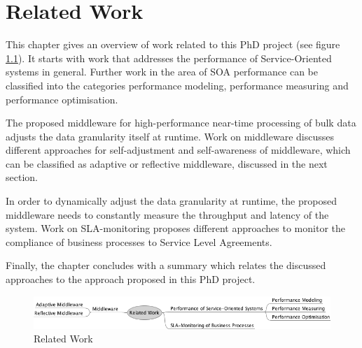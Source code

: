 \chapter{Related Work}\label{ch:03_related_work}

This chapter gives an overview of work related to this PhD project (see figure \ref{fig:related_work_map}). It starts with work that addresses the performance of Service-Oriented systems in general. Further work in the area of SOA performance can be classified into the categories performance modeling, performance measuring and performance optimisation.

The proposed middleware for high-performance near-time processing of bulk data adjusts the data granularity itself at runtime. Work on middleware discusses different approaches for self-adjustment and self-awareness of middleware, which can be classified as adaptive or reflective middleware, discussed in the next section.

In order to dynamically adjust the data granularity at runtime, the proposed middleware needs to constantly measure the throughput and latency of the system. Work on SLA-monitoring proposes different approaches to monitor the compliance of business processes to Service Level Agreements.

Finally, the chapter concludes with a summary which relates the discussed approaches to the approach proposed in this PhD project.
\begin{figure}[htbp]
	\centering
	\includegraphics[width=\textwidth]{img/related_work_map.png}
	\caption{Related Work}
	\label{fig:related_work_map}
\end{figure}
